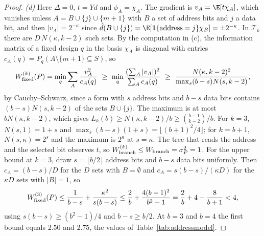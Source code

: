 \begin{proof}
\emph{(d)} Here $\Delta=0$, $t=Yd$ and $\phi_A=\chi_A$. The gradient is
$v_A=\E[t\chi_A]$, which vanishes unless $A=B\cup\{j\}\cup\{m+1\}$ with $B$ a
set of address bits and $j$ a data bit, and then $|v_A|=2^{-\kappa}$ since
$\hat d(B\cup\{j\})=\E[\mathbf 1\{\text{address}=j\}\chi_B]=\pm2^{-\kappa}$. In
$\mathcal T_k$ there are $D\,N(\kappa,k-2)$ such sets. By the computation in
(c), the information matrix of a fixed design $q$ in the basis $\chi_A$ is
diagonal with entries $c_A(q)=P_q(A\setminus\{m+1\}\subseteq S)$, so
\[
 W^{(k)}_{\rm fixed}(P)=\min_q\sum_A\frac{v_A^2}{c_A(q)}\ \ge\ \min_q\frac{(\sum_A|v_A|)^2}{\sum_Ac_A(q)}
   \ \ge\ \frac{N(\kappa,k-2)^2}{\max_{s}(b-s)N(s,k-2)},
\]
by Cauchy--Schwarz, since a form with $s$ address bits and $b-s$ data bits
contains $(b-s)N(s,k-2)$ of the sets $B\cup\{j\}$. The maximum is at most
$bN(\kappa,k-2)$, which gives $L_k(b)\ge N(\kappa,k-2)/b\ge\binom{b-1}{k-2}/b$.
For $k=3$, $N(s,1)=1+s$ and $\max_s(b-s)(1+s)=\lfloor(b+1)^2/4\rfloor$; for
$k=b+1$, $N(s,\kappa)=2^s$ and the maximum is $2^\kappa$ at $s=\kappa$. The
tree that reads the address and the selected bit observes $t$, so
$W^{(k)}_{\rm branch}\le W_{\rm branch}=\sigma_P^2=1$. For the upper bound at
$k=3$, draw $s=\lfloor b/2\rfloor$ address bits and $b-s$ data bits uniformly.
Then $c_A=(b-s)/D$ for the $D$ sets with $B=\emptyset$ and
$c_A=s(b-s)/(\kappa D)$ for the $\kappa D$ sets with $|B|=1$, so
\[
 W^{(3)}_{\rm fixed}(P)\le\frac1{b-s}+\frac{\kappa^2}{s(b-s)}
   \le\frac2b+\frac{4(b-1)^2}{b^2-1}=\frac2b+4-\frac8{b+1}<4,
\]
using $s(b-s)\ge(b^2-1)/4$ and $b-s\ge b/2$. At $b=3$ and $b=4$ the first
bound equals $2.50$ and $2.75$, the values of Table~\ref{tab:addressmodel}.


\end{proof}
